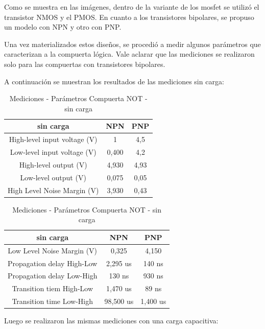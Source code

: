 Como se muestra en las imágenes, dentro de la variante de los mosfet
se utilizó el transistor NMOS y el PMOS. En cuanto a los transistores
bipolares, se propuso un modelo con NPN y otro con PNP.

Una vez materializados estos diseños, se procedió a medir algunos
parámetros que caracterizan a la compuerta lógica. Vale aclarar que
las mediciones se realizaron solo para las compuertas con transistores
bipolares.\newline

A continuación se muestran los resultados de las mediciones sin carga:
\begin{center}
\begin{table}[H]
\begin{tabular}{|c|c|c|}
\hline 
sin carga & NPN & PNP\tabularnewline
\hline 
\hline 
High-level input voltage (V) & 1 & 4,5\tabularnewline
\hline 
Low-level input voltage (V) & 0,400 & 4,2\tabularnewline
\hline 
High-level output (V) & 4,930 & 4,93\tabularnewline
\hline 
Low-level output (V) & 0,075 & 0,05\tabularnewline
\hline 
High Level Noise Margin (V) & 3,930 & 0,43\tabularnewline
\hline 
\end{tabular}\hfill    
\begin{tabular}{|c|c|c|}
\hline 
sin carga & NPN & PNP\tabularnewline
\hline 
\hline 
Low Level Noise Margin (V) & 0,325 & 4,150\tabularnewline
\hline 
Propagation delay High-Low  & 2,295 us & 140 ns\tabularnewline
\hline 
Propagation delay Low-High & 130 ns & 930 ns\tabularnewline
\hline 
Transition tiem High-Low & 1,470 us & 89 ns\tabularnewline
\hline 
Transition time Low-High & 98,500 us & 1,400 us\tabularnewline
\hline 
\end{tabular}
\caption{Mediciones - Parámetros Compuerta NOT - sin carga}
\end{table}
\end{center}

Luego se realizaron las mismas mediciones con una carga capacitiva:

